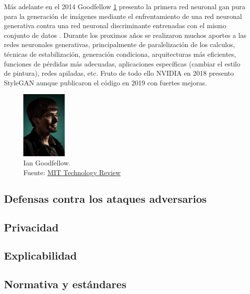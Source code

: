 Más adelante en el 2014 {Goodfellow} \ref{fig:gan-ian-goodfellow} presento la primera red neuronal \acrshort{gan} pura para la generación de imágenes mediante el enfrentamiento de una red neuronal generativa contra una red neuronal discriminante entrenadas con el mismo conjunto de datos \cite{goodfellow2014generative}.
Durante los proximos años se realizaron muchos aportes a las redes neuronales generativas, principalmente de paralelización de los calculos, técnicas de estabilización, generación condiciona, arquitecturas más eficientes, funciones de pérdidas más adecuadas, aplicaciones específicas (cambiar el estilo de pintura), redes apiladas, etc.
Fruto de todo ello {NVIDIA} en 2018 presento \gls{StyleGAN} \cite{karras2019stylebased} aunque publicaron el código en 2019 con fuertes mejoras.

\begin{figure}[H]
  \centering
  \includegraphics[width=0.2\textwidth]{figures/gan-goodfellow.png}
  \caption{Ian Goodfellow. \\Fuente: \href{https://www.technologyreview.es/s/10016/el-senor-de-las-gan-el-hombre-que-dio-imaginacion-las-maquinas}{MIT Technology Review}}
  \label{fig:gan-ian-goodfellow}
\end{figure}



\subsection{Defensas contra los ataques adversarios}

\subsection{Privacidad}

\subsection{Explicabilidad}

\subsection{Normativa y estándares}

